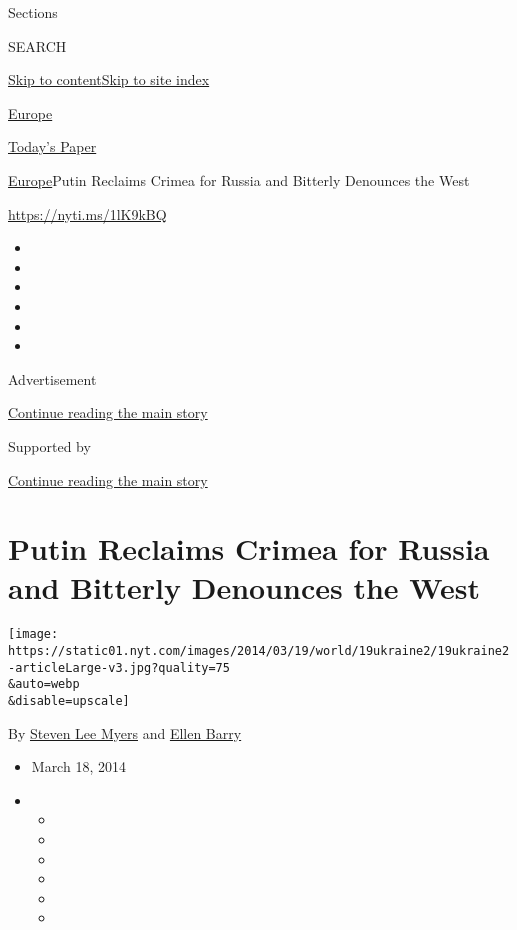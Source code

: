 Sections

SEARCH

\protect\hyperlink{site-content}{Skip to
content}\protect\hyperlink{site-index}{Skip to site index}

\href{https://www.nytimes.com/section/world/europe}{Europe}

\href{https://myaccount.nytimes.com/auth/login?response_type=cookie\&client_id=vi}{}

\href{https://www.nytimes.com/section/todayspaper}{Today's Paper}

\href{/section/world/europe}{Europe}\textbar{}Putin Reclaims Crimea for
Russia and Bitterly Denounces the West

\url{https://nyti.ms/1lK9kBQ}

\begin{itemize}
\item
\item
\item
\item
\item
\item
\end{itemize}

Advertisement

\protect\hyperlink{after-top}{Continue reading the main story}

Supported by

\protect\hyperlink{after-sponsor}{Continue reading the main story}

\hypertarget{putin-reclaims-crimea-for-russia-and-bitterly-denounces-the-west}{%
\section{Putin Reclaims Crimea for Russia and Bitterly Denounces the
West}\label{putin-reclaims-crimea-for-russia-and-bitterly-denounces-the-west}}

\texttt{[image: https://static01.nyt.com/images/2014/03/19/world/19ukraine2/19ukraine2-articleLarge-v3.jpg?quality=75\\\&auto=webp\\\&disable=upscale]}

By \href{http://www.nytimes.com/by/steven-lee-myers}{Steven Lee Myers}
and \href{https://www.nytimes.com/by/ellen-barry}{Ellen Barry}

\begin{itemize}
\item
  March 18, 2014
\item
  \begin{itemize}
  \item
  \item
  \item
  \item
  \item
  \item
  \end{itemize}
\end{itemize}

